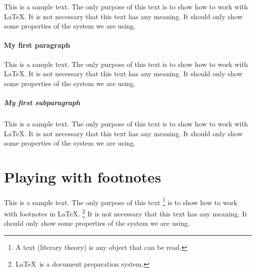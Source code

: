 \documentclass[10pt, paper=a4, abstracton]{scrartcl}
\begin{document}
This is a sample text. The only purpose of this text is to show how to work with \LaTeX . It is not necessary that this text has any meaning. It should only show some properties of the system we are using. 


\paragraph[First paragraph]{My first paragraph}

This is a sample text. The only purpose of this text is to show how to work with \LaTeX . It is not necessary that this text has any meaning. It should only show some properties of the system we are using. 


\subparagraph[First subparagraph]{My first subparagraph}

This is a sample text. The only purpose of this text is to show how to work with \LaTeX . It is not necessary that this text has any meaning. It should only show some properties of the system we are using. 


\section[Footnotes]{Playing with footnotes}

This is a sample text. The only purpose of this text%
%
\footnote{A text (literary theory) is any object that can be read.} %
%
is to show how to work with footnotes in \LaTeX .%
%
\footnote{\LaTeX\ is a document preparation system.} %
%
It is not necessary that this text has any meaning. It should only show some properties of the system we are using. 
\end{document}
